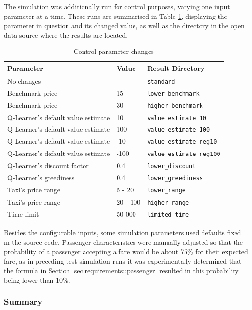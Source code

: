 The simulation was additionally run for control purposes, varying one input
parameter at a time. These runs are summarised in Table
\ref{table:inputs:control}, displaying the parameter in question and its
changed value, as well as the directory in the open data source where the
results are located.

\begin{table}
\begin{tabular}{ | l | l | l | }
  \hline
  Parameter & Value & Result Directory \\ \hline
  No changes & - & \texttt{standard} \\
  Benchmark price & 15 & \texttt{lower\_benchmark} \\
  Benchmark price & 30 & \texttt{higher\_benchmark} \\
  Q-Learner's default value estimate & 10 & \texttt{value\_estimate\_10} \\
  Q-Learner's default value estimate & 100 & \texttt{value\_estimate\_100} \\
  Q-Learner's default value estimate & -10 & \texttt{value\_estimate\_neg10} \\
  Q-Learner's default value estimate & -100 & \texttt{value\_estimate\_neg100} \\
  Q-Learner's discount factor & 0.4 & \texttt{lower\_discount} \\
  Q-Learner's greediness & 0.4 & \texttt{lower\_greediness} \\
  Taxi's price range & 5 - 20 & \texttt{lower\_range} \\
  Taxi's price range & 20 - 100 & \texttt{higher\_range} \\
  Time limit & 50 000 & \texttt{limited\_time} \\
  \hline
\end{tabular}
\caption{
  Control parameter changes
  \label{table:inputs:control}
}
\end{table}

Besides the configurable inputs, some simulation parameters used defaults
fixed in the source code. Passenger characteristics were manually adjusted so
that the probability of a passenger accepting a fare would be about 75\% for
their expected fare, as in preceding test simulation runs it was experimentally
determined that the formula in Section \ref{sec:requirements::passenger}
resulted in this probability being lower than 10\%.


\subsubsection{Summary}

